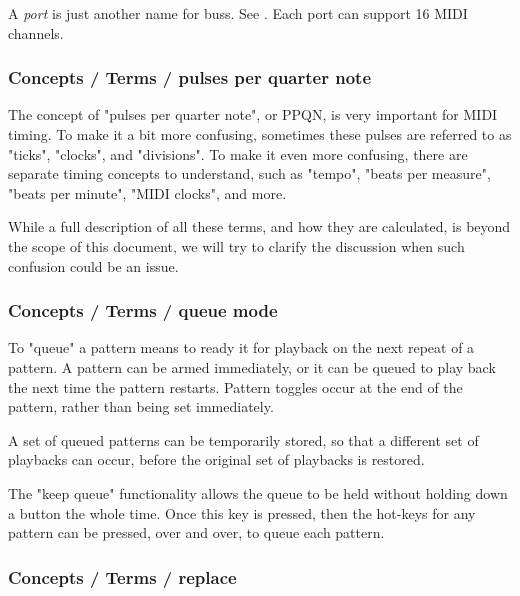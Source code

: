    A \textsl{port} is just another name for buss.
   See .
   Each port can support 16 MIDI channels.

\subsubsection{Concepts / Terms / pulses per quarter note}
\label{subsubsec:concepts_terms_pulses}

   The concept of "pulses per quarter note", or PPQN, is very important for
   MIDI timing.  To make it a bit more confusing, sometimes these pulses are
   referred to as "ticks", "clocks", and "divisions".
   To make it even more confusing, there are separate timing concepts to
   understand, such as "tempo", "beats per measure", "beats per minute",
   "MIDI clocks", and more.

   While a full description of all these terms, and how they are calculated, is
   beyond the scope of this document, we will try to clarify the discussion
   when such confusion could be an issue.

\subsubsection{Concepts / Terms / queue mode}
\label{subsubsec:concepts_terms_queue_mode}

   To "queue" a pattern means to ready it for playback on the next repeat of
   a pattern.  A pattern can be armed immediately, or it can be queued to
   play back the next time the pattern restarts.
   Pattern toggles occur at the end of
   the pattern, rather than being set immediately.

   A set of queued patterns can be temporarily stored, so that a different
   set of playbacks can occur, before the original set of playbacks is
   restored.

   The "keep queue" functionality allows the queue to be held without
   holding down a button the whole time.  Once this key is pressed,
   then the hot-keys for any pattern can be pressed, over and over,
   to queue each pattern.

\subsubsection{Concepts / Terms / replace}
\label{subsubsec:concepts_terms_replace}

